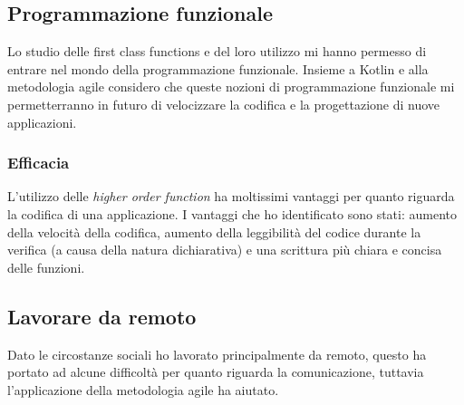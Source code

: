 \subsection{Programmazione funzionale}
Lo studio delle first class functions e del loro utilizzo mi hanno permesso di entrare nel mondo della programmazione funzionale. Insieme a Kotlin e alla metodologia agile considero che queste nozioni di programmazione funzionale mi permetterranno in futuro di velocizzare la codifica e la progettazione di nuove applicazioni.

\subsubsection*{Efficacia}
L'utilizzo delle \emph{higher order function} ha moltissimi vantaggi per quanto riguarda la codifica di una applicazione. I vantaggi che ho identificato sono stati: aumento della velocità della codifica, aumento della leggibilità del codice durante la verifica (a causa della natura dichiarativa) e una scrittura più chiara e concisa delle funzioni.

\subsection{Lavorare da remoto}
Dato le circostanze sociali ho lavorato principalmente da remoto, questo ha portato ad alcune difficoltà per quanto riguarda la comunicazione, tuttavia l'applicazione della metodologia agile ha aiutato. 
